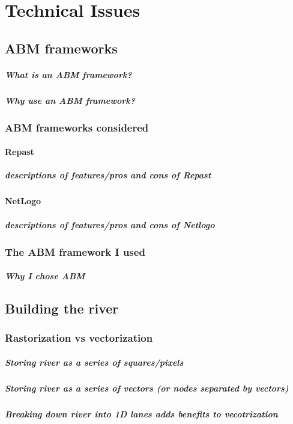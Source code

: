   \chapter{Technical Issues}
  \section{ABM frameworks}
    \paragraph{What is an ABM framework?}
    \paragraph{Why use an ABM framework?}

    \subsection{ABM frameworks considered}
      \subsubsection{Repast}
        \paragraph{descriptions of features/pros and cons of Repast}
      \subsubsection{NetLogo}
        \paragraph{descriptions of features/pros and cons of Netlogo}

    \subsection{The ABM framework I used}
      \paragraph{Why I chose ABM}

  \section{Building the river}
    \subsection{Rastorization vs vectorization}
      \paragraph{Storing river as a series of squares/pixels}
      \paragraph{Storing river as a series of vectors (or nodes separated by vectors)}
      \paragraph{Breaking down river into 1D lanes adds benefits to vecotrization}

